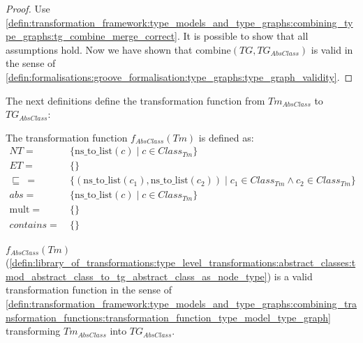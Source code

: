 \begin{proof}
Use \cref{defin:transformation_framework:type_models_and_type_graphs:combining_type_graphs:tg_combine_merge_correct}. It is possible to show that all assumptions hold. Now we have shown that $\mathrm{combine}(TG, TG_{AbsClass})$ is valid in the sense of \cref{defin:formalisations:groove_formalisation:type_graphs:type_graph_validity}.
\end{proof}

The next definitions define the transformation function from $Tm_{AbsClass}$ to $TG_{AbsClass}$:

\begin{defin}
\label{defin:library_of_transformations:type_level_transformations:abstract_classes:tmod_abstract_class_to_tg_abstract_class_as_node_type}
The transformation function $f_{AbsClass}(Tm)$ is defined as:
\begin{align*}
NT =\ &\{\mathrm{ns\_\!to\_\!list}(c) \mid c \in Class_{Tm}\} \\
ET =\ &\{\} \\
\!\!\sqsubseteq\ =\ &\{(\mathrm{ns\_\!to\_\!list}(c_1), \mathrm{ns\_\!to\_\!list}(c_2)) \mid c_1 \in Class_{Tm} \land c_2 \in Class_{Tm} \} \\
abs =\ &\{\mathrm{ns\_\!to\_\!list}(c) \mid c \in Class_{Tm}\} \\
\mathrm{mult} =\ &\{\} \\
contains =\ &\{\}
\end{align*}
\end{defin}

\begin{thm}
\label{defin:library_of_transformations:type_level_transformations:abstract_classes:tmod_abstract_class_to_tg_abstract_class_as_node_type_func}
$f_{AbsClass}(Tm)$ (\cref{defin:library_of_transformations:type_level_transformations:abstract_classes:tmod_abstract_class_to_tg_abstract_class_as_node_type}) is a valid transformation function in the sense of \cref{defin:transformation_framework:type_models_and_type_graphs:combining_transformation_functions:transformation_function_type_model_type_graph} transforming $Tm_{AbsClass}$ into $TG_{AbsClass}$.
\end{thm}

